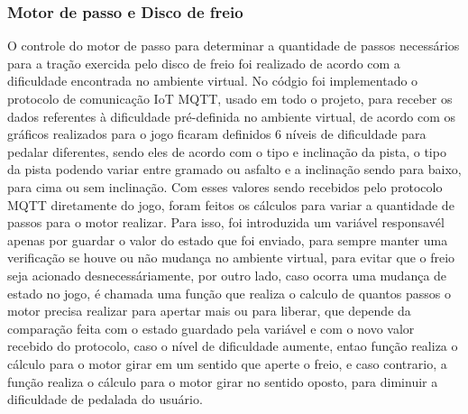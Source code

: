     \subsubsection{Motor de passo e Disco de freio}

		O controle do motor de passo para determinar a quantidade de passos necessários para a tração exercida pelo disco de freio foi realizado  de acordo com a dificuldade encontrada no ambiente virtual. No códgio foi implementado o protocolo de comunicação IoT MQTT, usado em todo o projeto, para receber os dados referentes à dificuldade pré-definida no ambiente virtual, de acordo com os gráficos realizados para o jogo ficaram definidos 6 níveis de dificuldade para pedalar diferentes, sendo eles de acordo com o tipo e inclinação da pista, o tipo da pista podendo variar entre gramado ou asfalto e a inclinação sendo para baixo, para cima ou sem inclinação. Com esses  valores sendo recebidos pelo protocolo MQTT diretamente do jogo, foram feitos os cálculos para variar a quantidade de passos para o motor realizar. Para isso, foi introduzida um variável responsavél apenas por guardar o valor do estado que foi enviado, para sempre manter uma verificação se houve ou não mudança no ambiente virtual, para evitar que o freio seja acionado desnecessáriamente, por outro lado, caso ocorra uma mudança de estado no jogo, é chamada uma função que realiza o calculo de quantos passos o motor precisa realizar para apertar mais ou para liberar, que depende da comparação feita com o estado guardado pela variável e com o novo valor recebido do protocolo, caso o nível de dificuldade aumente, entao função realiza o cálculo para o motor girar em um sentido que aperte o freio, e caso contrario, a função realiza o cálculo para o motor girar no sentido oposto, para diminuir a dificuldade de pedalada do usuário.
 






